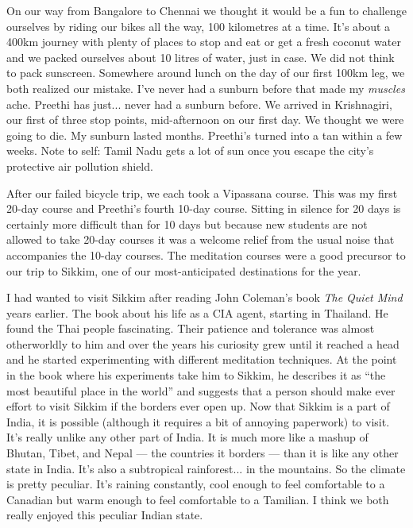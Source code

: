 \documentclass{article}
\begin{document}
On our way from Bangalore to Chennai we thought it would be a fun to challenge
ourselves by riding our bikes all the way, 100 kilometres at a time. It's about a
400km journey with plenty of places to stop and eat or get a fresh coconut water and
we packed ourselves about 10 litres of water, just in case. We did not think to pack
sunscreen. Somewhere around lunch on the day of our first 100km leg, we both realized our
mistake. I've never had a sunburn before that made my \textit{muscles} ache. Preethi
has just... never had a sunburn before. We arrived in
Krishnagiri, our first of three stop points, mid-afternoon on our first day. We
thought we were going to die. My sunburn lasted months. Preethi's turned into a tan
within a few weeks. Note to self: Tamil Nadu gets a lot of sun once you escape the
city's protective air pollution shield.

After our failed bicycle trip, we each took a Vipassana course. This was my first
20-day course and Preethi's fourth 10-day course. Sitting in silence for 20 days is
certainly more difficult than for 10 days but because new students are not allowed to
take 20-day courses it was a welcome relief from the usual noise that accompanies the
10-day courses. The meditation courses were a good precursor to our trip to Sikkim,
one of our most-anticipated destinations for the year.

I had wanted to visit Sikkim after reading John Coleman's book \textit{The Quiet Mind}
years earlier. The book about his life as a CIA agent, starting in Thailand. He found the Thai people
fascinating. Their patience and tolerance was almost otherworldly to him and over the
years his curiosity grew until it reached a head and he started experimenting with
different meditation techniques. At the point in the book where his experiments take
him to Sikkim, he describes it as ``the most beautiful place in the world'' and
suggests that a person should make ever effort to visit Sikkim if the borders ever
open up. Now that Sikkim is a part of India, it is possible (although it requires a
bit of annoying paperwork) to visit. It's really unlike any other part of India. It
is much more like a mashup of Bhutan, Tibet, and Nepal --- the countries it borders
--- than it is like any other state in India. It's also a subtropical
rainforest... in the mountains. So the climate is pretty peculiar. It's raining
constantly, cool enough to feel comfortable to a Canadian but warm enough to feel
comfortable to a Tamilian. I think we both really enjoyed this peculiar Indian
state.
\end{document}
